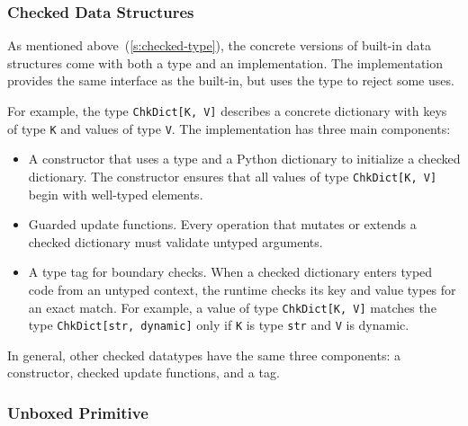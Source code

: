 \documentclass[english,cleveref,submission]{programming}
\newcommand{\code}[1]{\texttt{#1}}
\begin{document}
\subsubsection{Checked Data Structures}
\label{s:chkdict-impl}

As mentioned above~(\cref{s:checked-type}), the concrete versions of built-in data structures
come with both a type and an implementation.
The implementation provides the same interface as the built-in,
but uses the type to reject some uses.

For example, the type \code{ChkDict[K, V]} describes a concrete dictionary
with keys of type \code{K} and values of type \code{V}.
The implementation has three main components:
\begin{itemize}
  \item
    A constructor that uses a type and a Python dictionary
    to initialize a checked dictionary.
    The constructor ensures that all values of type \code{ChkDict[K, V]}
    begin with well-typed elements.
  \item
    Guarded update functions.
    Every operation that mutates or extends a checked dictionary must
    validate untyped arguments.
  \item
    A type tag for boundary checks.
    When a checked dictionary enters typed code from an untyped context,
    the runtime checks its key and value types for an exact match.
    For example, a value of type \code{ChkDict[K, V]} matches the type
    \code{ChkDict[str, dynamic]} only if \code{K} is type \code{str}
    and \code{V} is dynamic.
\end{itemize}
%
In general, other checked datatypes have the same three components:
a constructor, checked update functions, and a tag.


\subsubsection{Unboxed Primitive}
\label{s:c-types}

\end{document}
